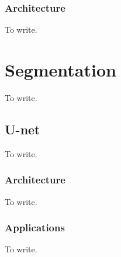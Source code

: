 \subsubsection{Architecture}
To write.




\section{Segmentation}
To write.

\subsection{U-net}
To write.

\subsubsection{Architecture}
To write.

\subsubsection{Applications}
To write.

